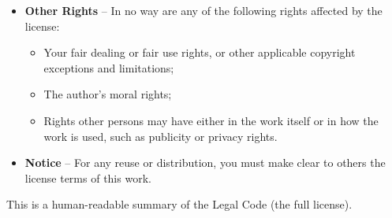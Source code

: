 \begin{frame}
\begin{description}
\begin{itemize}
    \item \textbf{Other Rights} -- In no way are any of the following
      rights affected by the license:
      \begin{itemize}
      \tiny
      \item Your fair dealing or fair use rights, or other
        applicable copyright exceptions and limitations;
      \item The author's moral rights;
      \item Rights other persons may have either in the work itself
        or in how the work is used, such as publicity or privacy
        rights.
      \end{itemize}
    \item \textbf{Notice} -- For any reuse or distribution, you must
      make clear to others the license terms of this work.
    \end{itemize}
  \end{description}

  This is a human-readable summary of the Legal Code (the full
  license).


\end{frame}

